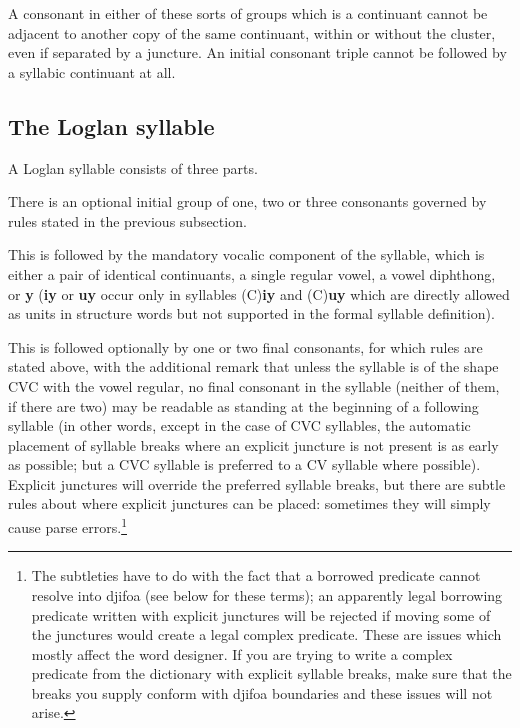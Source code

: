 \documentclass[12pt]{book}
\begin{document}
A consonant in either of these sorts of groups which is a continuant cannot be adjacent to another copy of the same continuant, within or without the cluster, even if separated by a juncture.
An initial consonant triple cannot be followed by a syllabic continuant at all.

\subsection{The Loglan syllable}

A Loglan syllable consists of three parts. 

 There is an optional initial group of one, two or three consonants governed by rules stated in the previous subsection.  

This is followed by the mandatory vocalic component of the syllable, which is either a pair of identical continuants, a single regular vowel, a vowel diphthong, or {\bf y} ({\bf iy}  or {\bf uy} occur only in syllables (C){\bf iy} and (C){\bf uy} which are directly allowed as units in structure words but not supported in the formal syllable definition).

This is followed optionally by one or two final consonants, for which rules are stated above, with the additional remark that unless the syllable is of the shape CVC with the vowel regular,   no final consonant in the syllable (neither of them, if there are two)  may be readable as standing at the beginning of a following syllable (in other words, except in the case of CVC syllables, the automatic placement of syllable breaks where an explicit juncture is not present  is as early as possible;  but a CVC syllable is preferred to a CV syllable where possible).  Explicit junctures will override the preferred syllable breaks, but there are subtle rules about where explicit junctures can be placed:  sometimes they will simply cause parse errors.\footnote{The subtleties have to do with the fact that a borrowed predicate cannot resolve into djifoa (see below for these terms);  an apparently legal borrowing predicate written with explicit junctures will be rejected if moving some of the junctures would create a legal complex predicate.  These are issues which mostly affect the word designer.  If you are trying to write a complex predicate from the dictionary with explicit syllable breaks, make sure that the breaks you supply conform with djifoa boundaries and these issues will not arise.}
\end{document}
